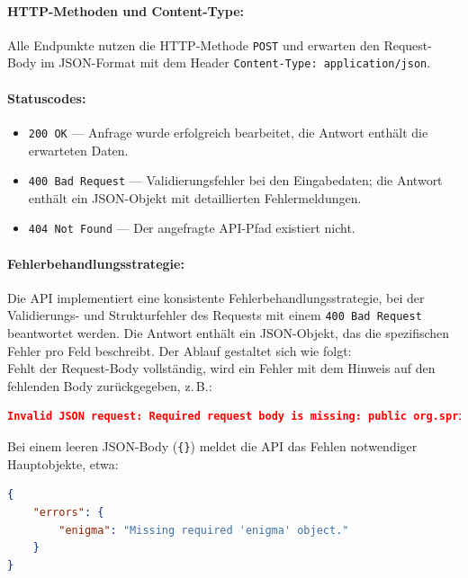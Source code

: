 \documentclass[12pt, ngerman, a4paper, numbers=noenddot]{article}
\begin{document}
\paragraph{HTTP-Methoden und Content-Type:}

Alle Endpunkte nutzen die HTTP\hyp{}Methode \lstinline|POST| und erwarten den Request-Body im JSON-Format mit dem Header \lstinline|Content-Type: application/json|.

\paragraph{Statuscodes:}

\begin{itemize}
	\item \lstinline|200 OK| — Anfrage wurde erfolgreich bearbeitet, die Antwort enthält die erwarteten Daten.
	\item \lstinline|400 Bad Request| — Validierungsfehler bei den Eingabedaten; die Antwort enthält ein JSON-Objekt mit detaillierten Fehlermeldungen.
	\item \lstinline|404 Not Found| — Der angefragte API-Pfad existiert nicht.
\end{itemize}


\paragraph{Fehlerbehandlungsstrategie:}

Die API implementiert eine konsistente Fehlerbehandlungsstrategie, bei der Validierungs- und Strukturfehler des Requests mit einem \lstinline|400 Bad Request| beantwortet werden. Die Antwort enthält ein JSON-Objekt, das die spezifischen Fehler pro Feld beschreibt. Der Ablauf gestaltet sich wie folgt:\\


Fehlt der Request-Body vollständig, wird ein Fehler mit dem Hinweis auf den fehlenden Body zurückgegeben, z.\,B.:

\begin{lstlisting}[language=json]
Invalid JSON request: Required request body is missing: public org.springframework.http.ResponseEntity<?> ...
\end{lstlisting}

Bei einem leeren JSON-Body (\lstinline|{}|) meldet die API das Fehlen notwendiger Hauptobjekte, etwa:

\begin{lstlisting}[language=json]
{
	"errors": {
		"enigma": "Missing required 'enigma' object."
	}
}
\end{lstlisting}
\end{document}

